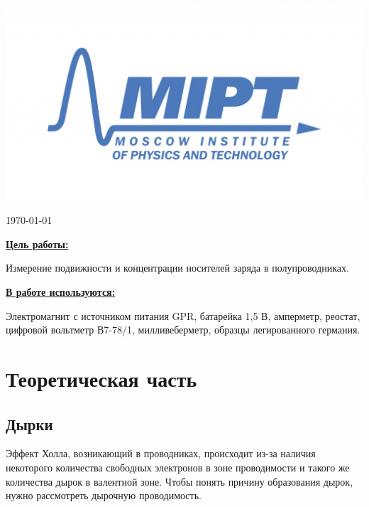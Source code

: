 \documentclass[a4paper, 12pt, twoside]{article}
\newenvironment{bottompar}{\par\vspace*{\fill}}{\clearpage}
\begin{document}
\begin{titlepage}
\begin{bottompar}
	\begin{center}
		\includegraphics[width = 80 mm]{logo.jpg}
	\end{center}
	{\large \today}

\end{bottompar}
\vfill %

\end{titlepage}

{\Large \uline { \textbf  {Цель работы:}}}

\vspace{2mm}
Измерение подвижности и концентрации носителей заряда в полупроводниках.
\vspace{\baselineskip}

{\Large \uline { \textbf  {В работе используются:}}}

\vspace{2mm}

Электромагнит с источником питания GPR, батарейка 1,5 В, амперметр, реостат, цифровой вольтметр В7-78/1, милливеберметр, образцы легированного германия.

\section{Теоретическая часть}

\subsection{Дырки}

Эффект Холла, возникающий в проводниках, происходит из-за наличия некоторого количества свободных электронов в зоне проводимости и такого же количества дырок в валентной зоне. Чтобы понять причину образования дырок, нужно рассмотреть дырочную проводимость.
\end{document}
